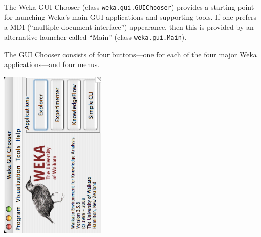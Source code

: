 %
%
%
%


The Weka GUI Chooser (class \texttt{weka.gui.GUIChooser}) provides a
starting point for launching Weka's main GUI applications and
supporting tools. If one prefers a MDI (``multiple document
interface'') appearance, then this is provided by an alternative
launcher called ``Main'' (class \texttt{weka.gui.Main}).


The GUI Chooser consists of four buttons---one for each of the four
major Weka applications---and four menus. 

\begin{center}
	\includegraphics[angle=270,width=5cm]{images/launching/GUIChooser.eps}
\end{center}

